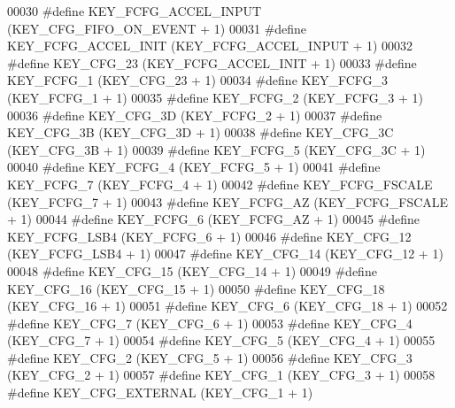 \begin{DoxyCode}
00030 \textcolor{preprocessor}{#define KEY\_FCFG\_ACCEL\_INPUT        (KEY\_CFG\_FIFO\_ON\_EVENT + 1)}
00031 \textcolor{preprocessor}{#define KEY\_FCFG\_ACCEL\_INIT         (KEY\_FCFG\_ACCEL\_INPUT + 1)}
00032 \textcolor{preprocessor}{#define KEY\_CFG\_23                  (KEY\_FCFG\_ACCEL\_INIT + 1)}
00033 \textcolor{preprocessor}{#define KEY\_FCFG\_1                  (KEY\_CFG\_23 + 1)}
00034 \textcolor{preprocessor}{#define KEY\_FCFG\_3                  (KEY\_FCFG\_1 + 1)}
00035 \textcolor{preprocessor}{#define KEY\_FCFG\_2                  (KEY\_FCFG\_3 + 1)}
00036 \textcolor{preprocessor}{#define KEY\_CFG\_3D                  (KEY\_FCFG\_2 + 1)}
00037 \textcolor{preprocessor}{#define KEY\_CFG\_3B                  (KEY\_CFG\_3D + 1)}
00038 \textcolor{preprocessor}{#define KEY\_CFG\_3C                  (KEY\_CFG\_3B + 1)}
00039 \textcolor{preprocessor}{#define KEY\_FCFG\_5                  (KEY\_CFG\_3C + 1)}
00040 \textcolor{preprocessor}{#define KEY\_FCFG\_4                  (KEY\_FCFG\_5 + 1)}
00041 \textcolor{preprocessor}{#define KEY\_FCFG\_7                  (KEY\_FCFG\_4 + 1)}
00042 \textcolor{preprocessor}{#define KEY\_FCFG\_FSCALE             (KEY\_FCFG\_7 + 1)}
00043 \textcolor{preprocessor}{#define KEY\_FCFG\_AZ                 (KEY\_FCFG\_FSCALE + 1)}
00044 \textcolor{preprocessor}{#define KEY\_FCFG\_6                  (KEY\_FCFG\_AZ + 1)}
00045 \textcolor{preprocessor}{#define KEY\_FCFG\_LSB4               (KEY\_FCFG\_6 + 1)}
00046 \textcolor{preprocessor}{#define KEY\_CFG\_12                  (KEY\_FCFG\_LSB4 + 1)}
00047 \textcolor{preprocessor}{#define KEY\_CFG\_14                  (KEY\_CFG\_12 + 1)}
00048 \textcolor{preprocessor}{#define KEY\_CFG\_15                  (KEY\_CFG\_14 + 1)}
00049 \textcolor{preprocessor}{#define KEY\_CFG\_16                  (KEY\_CFG\_15 + 1)}
00050 \textcolor{preprocessor}{#define KEY\_CFG\_18                  (KEY\_CFG\_16 + 1)}
00051 \textcolor{preprocessor}{#define KEY\_CFG\_6                   (KEY\_CFG\_18 + 1)}
00052 \textcolor{preprocessor}{#define KEY\_CFG\_7                   (KEY\_CFG\_6 + 1)}
00053 \textcolor{preprocessor}{#define KEY\_CFG\_4                   (KEY\_CFG\_7 + 1)}
00054 \textcolor{preprocessor}{#define KEY\_CFG\_5                   (KEY\_CFG\_4 + 1)}
00055 \textcolor{preprocessor}{#define KEY\_CFG\_2                   (KEY\_CFG\_5 + 1)}
00056 \textcolor{preprocessor}{#define KEY\_CFG\_3                   (KEY\_CFG\_2 + 1)}
00057 \textcolor{preprocessor}{#define KEY\_CFG\_1                   (KEY\_CFG\_3 + 1)}
00058 \textcolor{preprocessor}{#define KEY\_CFG\_EXTERNAL            (KEY\_CFG\_1 + 1)}

\end{DoxyCode}
